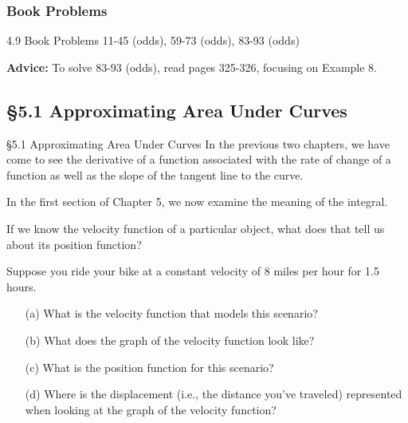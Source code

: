 \documentclass[cal1spr16Lectures.tex]{subfiles}
\begin{document}
\subsubsection{Book Problems}

\begin{frame}
\begin{block}{4.9 Book Problems}
11-45 (odds), 59-73 (odds), 83-93 (odds) 
\end{block}
{\bf Advice:} To solve 83-93 (odds), read pages 325-326, focusing on Example 8. 
\end{frame}

\subsection[5.1 Approximating Area Under Curves]{\S 5.1 Approximating Area Under Curves}

\begin{frame}{\S 5.1 Approximating Area Under Curves}\small
In the previous two chapters, we have come to see the derivative of a function associated with the rate of change of a function as well as the slope of the tangent line to the curve.
\vspace{1pc}

In the first section of Chapter 5, we now examine the meaning of the integral.
\begin{que}
If we know the velocity function of a particular object, what does that tell us about its position function?
\end{que}
\end{frame}

\begin{frame}\small
\begin{ex} 
Suppose you ride your bike at a constant velocity of 8 miles per hour for 1.5 hours.
\begin{itemize}
\item[(a)] What is the velocity function that models this scenario?
\item[(b)] What does the graph of the velocity function look like?
\item[(c)] What is the position function for this scenario?
\item[(d)] Where is the displacement (i.e., the distance you've traveled) represented when looking at the graph of the velocity function?
\end{itemize}
\end{ex}
\end{frame}
\end{document}
